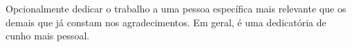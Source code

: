 Opcionalmente dedicar o trabalho a uma pessoa específica mais relevante que os demais que já constam nos agradecimentos. Em geral, é uma dedicatória de cunho mais pessoal. 